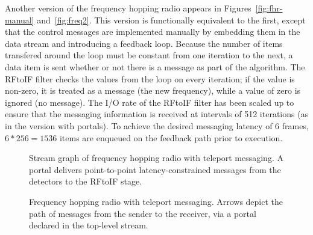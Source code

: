 \documentclass{sig-alternate}
\begin{document}
Another version of the frequency hopping radio appears in
Figures~\ref{fig:fhr-manual} and~\ref{fig:freq2}.  This version is
functionally equivalent to the first, except that the control messages
are implemented manually by embedding them in the data stream and
introducing a feedback loop.  Because the number of items transfered
around the loop must be constant from one iteration to the next, a
data item is sent whether or not there is a message as part of the
algorithm.  The RFtoIF filter checks the values from the loop on every
iteration; if the value is non-zero, it is treated as a message (the
new frequency), while a value of zero is ignored (no message).  The
I/O rate of the RFtoIF filter has been scaled up to ensure that the
messaging information is received at intervals of 512 iterations (as
in the version with portals).  To achieve the desired messaging
latency of 6 frames, $6*256 = 1536$ items are enqueued on the feedback
path prior to execution.

\begin{figure}[t]
\vspace{-12pt}
\centering
{}
\vspace{-8pt}
\caption{\small Stream graph of frequency hopping radio with teleport messaging.  
A portal delivers point-to-point latency-constrained messages from the
detectors to the RFtoIF stage.
\protect\label{fig:fhr-streamit}}
\vspace{-12pt}
\end{figure}

\begin{figure}[t]
\vspace{-12pt}
\hspace{-0.2in}
\vspace{-24pt}
\caption{\small Frequency hopping radio with teleport messaging.
Arrows depict the path of messages from the sender to the receiver,
via a portal declared in the top-level stream.
\protect\label{fig:freq1}}
\vspace{-12pt}
\end{figure}

\end{document}

